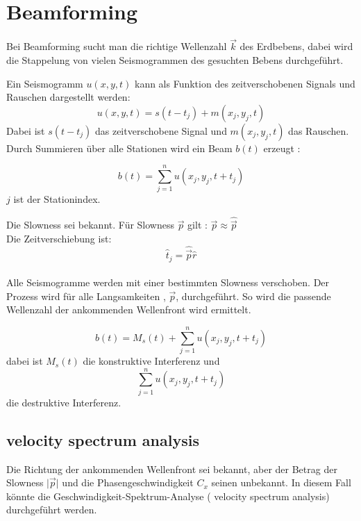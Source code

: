 \chapter{Beamforming}

Bei Beamforming sucht man die richtige Wellenzahl $\vec{k}$ des Erdbebens, dabei wird die Stappelung von vielen Seismogrammen des gesuchten Bebens durchgeführt. 

Ein Seismogramm $u(x,y,t)$ kann als Funktion des zeitverschobenen Signals und Rauschen dargestellt werden:
\begin{equation}
u(x,y,t) = s(t-t_{j})+m(x_{j},y_{j},t)
\end{equation}
 Dabei ist $s(t-t_{j})$ das zeitverschobene Signal und $m(x_{j},y_{j},t)$ das Rauschen.
 \\
 Durch Summieren über alle Stationen wird ein Beam $b(t)$ erzeugt :
 
 \begin{equation} b(t) = \sum_{j=1}^{n} u( x_{j},y_{j},t+t_{j})\end{equation}
 $j$ ist der Stationindex.
 
 Die Slowness sei bekannt. Für Slowness $\vec{p}$ gilt : $ \vec{p}\approx \hat{\vec{p}}$
 \\ Die Zeitverschiebung ist:  \begin{equation}\hat{t}_{j}=\hat{\vec{p}}\hat{r}\end{equation}
 \\ Alle Seismogramme werden mit einer bestimmten Slowness verschoben. Der Prozess wird für alle Langsamkeiten , $\vec{p}$, durchgeführt. So wird die passende Wellenzahl der ankommenden Wellenfront wird ermittelt. 
 

 \begin{equation}b(t) = M_{s}(t)+ \sum_{j=1}^{n} u( x_{j},y_{j},t+t_{j})\end{equation}
 dabei ist $M_{s}(t)$ die konstruktive Interferenz und \begin{equation*}\sum_{j=1}^{n} u( x_{j},y_{j},t+t_{j})
\end{equation*} die destruktive Interferenz.

\section{velocity spectrum analysis}
Die Richtung der ankommenden Wellenfront sei bekannt, aber der Betrag der Slowness  $\vert\vec{p}\vert$ und die Phasengeschwindigkeit $C_{x}$ seinen unbekannt.
In diesem Fall könnte die Geschwindigkeit-Spektrum-Analyse ( velocity spectrum analysis) durchgeführt werden.

